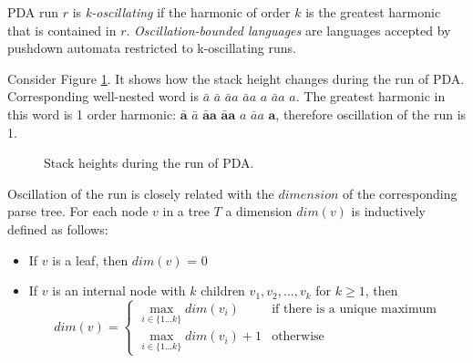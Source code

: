PDA run $r$ is \textit{k-oscillating} if the harmonic of order $k$ is the greatest harmonic that is contained in $r$. \textit{Oscillation-bounded languages} are languages accepted by pushdown automata restricted to k-oscillating runs.
\begin{example}
Consider Figure \ref{oscb}. It shows how the stack height changes during the run of PDA. Corresponding well-nested word is $\bar{a}$ $\bar{a}$ $\bar{a}a$ $\bar{a}a$ $a$ $\bar{a}a$ $a$. The greatest harmonic in this word is 1 order harmonic: $\mathbf{\bar{a}}$ $\bar{a}$ $\mathbf{\bar{a}a}$ $\mathbf{\bar{a}a}$ $a$ $\bar{a}a$ $\mathbf{a}$, therefore oscillation of the run is 1.
\end{example}
\begin{figure}
\caption{Stack heights during the run of PDA.}
\label{oscb}
\end{figure}


Oscillation of the run is closely related with the $dimension$ of the corresponding parse tree. For each node $v$ in a tree $T$ a dimension $dim(v)$ is inductively defined as follows:
\begin{itemize}
\item If $v$ is a leaf, then $dim(v)$ = 0
\item If $v$ is an internal node with $k$ children $v_1, v_2, ..., v_k$ for $k \ge 1$, then 
\begin{equation}
dim(v) = 
 \begin{cases}
   \max_{i \in \{1...k\}}dim(v_i) &\text{if there is a unique maximum}\\
   \max_{i \in \{1...k\}}dim(v_i)+1 &\text{otherwise}
 \end{cases}
\end{equation}
\end{itemize}


